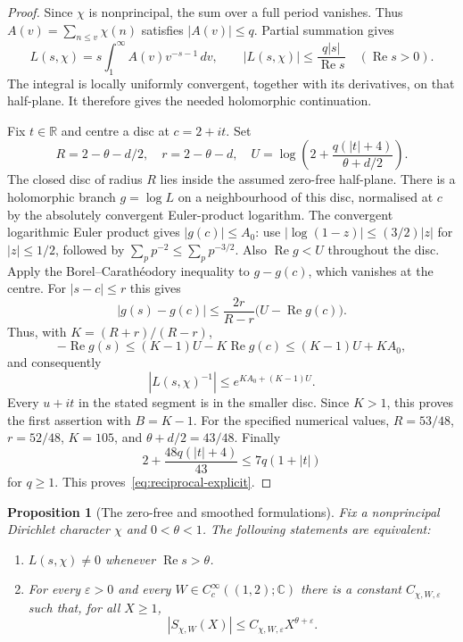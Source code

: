 \documentclass[screen,reqno]{aomart}
\numberwithin{equation}{section}
\newtheorem{proposition}[theorem]{Proposition}
\theoremstyle{definition}
\renewcommand{\Re}{\operatorname{Re}}
\newcommand{\C}{\mathbb{C}}
\newcommand{\R}{\mathbb{R}}
\begin{document}
\begin{proof}
Since $\chi$ is nonprincipal, the sum over a full period vanishes. Thus
$A(v)=\sum_{n\le v}\chi(n)$ satisfies $|A(v)|\le q$. Partial summation gives
\[
 L(s,\chi)=s\int_1^\infty A(v)v^{-s-1}\,dv,
 \qquad |L(s,\chi)|\le\frac{q|s|}{\Re s}\quad(\Re s>0).
\]
The integral is locally uniformly convergent, together with its derivatives,
on that half-plane. It therefore gives the needed holomorphic continuation.

Fix $t\in\R$ and centre a disc at $c=2+it$. Set
\[
 R=2-\theta-d/2,\quad r=2-\theta-d,\quad
 U=\log\left(2+\frac{q(|t|+4)}{\theta+d/2}\right).
\]
The closed disc of radius $R$ lies inside the assumed zero-free half-plane.
There is a holomorphic branch $g=\log L$ on a neighbourhood of this disc,
normalised at $c$ by the absolutely convergent Euler-product logarithm.
The convergent logarithmic Euler product gives $|g(c)|\le A_0$: use
$|\log(1-z)|\le(3/2)|z|$ for $|z|\le1/2$, followed by
$\sum_p p^{-2}\le\sum_p p^{-3/2}$. Also $\Re g<U$ throughout the disc.
Apply the Borel--Carath\'eodory inequality to $g-g(c)$, which vanishes at the centre.
For $|s-c|\le r$ this gives
\[
 |g(s)-g(c)|\le\frac{2r}{R-r}\bigl(U-\Re g(c)\bigr).
\]
Thus, with $K=(R+r)/(R-r)$,
\[
 -\Re g(s)\le (K-1)U-K\Re g(c)\le (K-1)U+KA_0,
\]
and consequently
\[
 |L(s,\chi)^{-1}|\le e^{KA_0+(K-1)U}.
\]
Every $u+it$ in the stated segment is in the smaller disc. Since $K>1$,
this proves the first assertion with $B=K-1$. For the specified numerical
values, $R=53/48$, $r=52/48$, $K=105$, and $\theta+d/2=43/48$.
Finally
\[
 2+\frac{48q(|t|+4)}{43}\le 7q(1+|t|)
\]
for $q\ge1$. This proves~\eqref{eq:reciprocal-explicit}.
\end{proof}

\begin{proposition}[The zero-free and smoothed formulations]\label{prop:mobius-equivalence}
Fix a nonprincipal Dirichlet character $\chi$ and $0<\theta<1$.
The following statements are equivalent:
\begin{enumerate}
\item[(i)] $L(s,\chi)\ne0$ whenever $\Re s>\theta$.
\item[(ii)] For every $\varepsilon>0$ and every
$W\in C_c^\infty((1,2);\C)$ there is a constant $C_{\chi,W,\varepsilon}$
such that, for all $X\ge1$,
\[
 |S_{\chi,W}(X)|\le C_{\chi,W,\varepsilon}X^{\theta+\varepsilon}.
\]
\end{enumerate}
\end{proposition}
\end{document}
